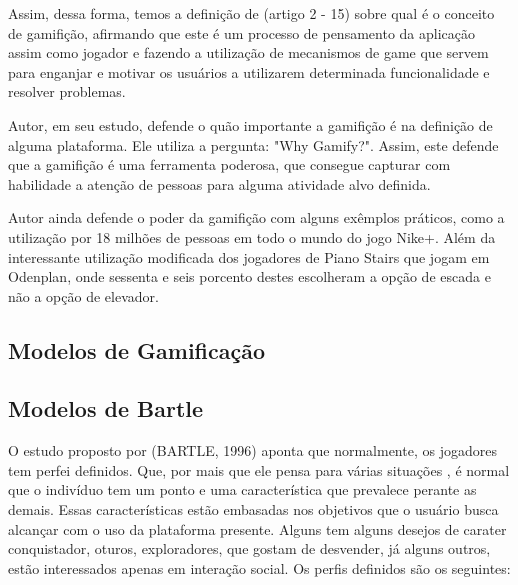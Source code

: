 Assim, dessa forma, temos a definição de (artigo 2 - 15) sobre qual é o conceito de
gamifição, afirmando que este é um processo de pensamento da aplicação assim
como jogador e fazendo a utilização
de mecanismos de game que servem para enganjar e motivar os usuários a utilizarem
determinada funcionalidade e resolver problemas.

Autor, em seu estudo, defende o quão importante a gamifição é na definição
de alguma plataforma. Ele utiliza a pergunta: "Why Gamify?". Assim, este defende
que a gamifição é uma ferramenta poderosa, que consegue capturar com habilidade
a atenção de pessoas para alguma atividade alvo definida.

Autor ainda defende  o poder da gamifição com alguns exêmplos práticos,
como a utilização por 18 milhões de pessoas em todo o mundo do jogo Nike+.
Além da interessante utilização modificada dos jogadores de
Piano Stairs que jogam em Odenplan, onde sessenta e seis porcento destes
escolheram a opção de escada e não a opção de elevador.

\subsection{Modelos de Gamificação}
\label{sub:modelogamifição}

\subsection{Modelos de Bartle}
\label{sub:modeloBartle}
O estudo proposto por (BARTLE, 1996) aponta que normalmente, os jogadores
tem perfei definidos. Que, por mais que ele pensa para várias situações
, é normal que o indivíduo tem um ponto e uma característica que prevalece
perante as demais. Essas características estão embasadas nos objetivos
que o usuário  busca alcançar com o uso da plataforma presente. Alguns
tem alguns desejos de carater conquistador, oturos, exploradores, que gostam
de desvender, já alguns outros, estão interessados apenas em interação
social. Os perfis definidos são os seguintes:


